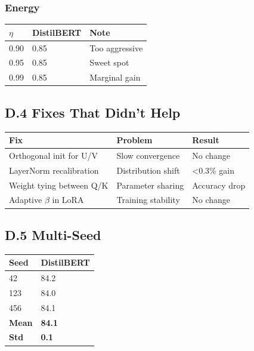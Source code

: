\subsubsection{Energy}

\begin{table}[H]
\centering
\small
\begin{tabular}{lll}
\toprule
\textbf{$\eta$} & \textbf{DistilBERT} & \textbf{Note} \\
\midrule
0.90 & 0.85 & Too aggressive \\
0.95 & 0.85 & Sweet spot \\
0.99 & 0.85 & Marginal gain \\
\bottomrule
\end{tabular}
\end{table}

\subsection{D.4 Fixes That Didn't Help}

\begin{table}[H]
\centering
\small
\begin{tabular}{lll}
\toprule
\textbf{Fix} & \textbf{Problem} & \textbf{Result} \\
\midrule
Orthogonal init for U/V & Slow convergence & No change \\
LayerNorm recalibration & Distribution shift & \textless{}0.3\% gain \\
Weight tying between Q/K & Parameter sharing & Accuracy drop \\
Adaptive $\beta$ in LoRA & Training stability & No change \\
\bottomrule
\end{tabular}
\end{table}

\subsection{D.5 Multi-Seed}

\begin{table}[H]
\centering
\small
\begin{tabular}{ll}
\toprule
\textbf{Seed} & \textbf{DistilBERT} \\
\midrule
42 & 84.2 \\
123 & 84.0 \\
456 & 84.1 \\
\textbf{Mean} & \textbf{84.1} \\
\textbf{Std} & \textbf{0.1} \\
\bottomrule
\end{tabular}
\end{table}

